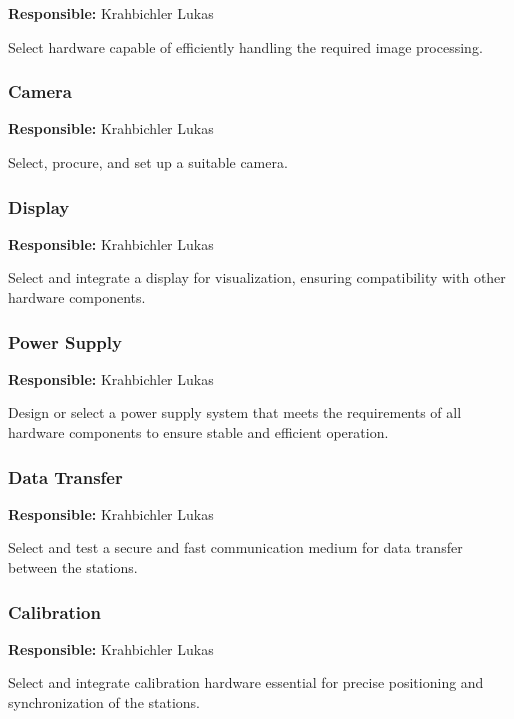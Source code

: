 \textbf{Responsible:} Krahbichler Lukas

Select hardware capable of efficiently handling the required image processing.

\subsubsection{Camera} %

\textbf{Responsible:} Krahbichler Lukas

Select, procure, and set up a suitable camera.

\subsubsection{Display} %

\textbf{Responsible:} Krahbichler Lukas

Select and integrate a display for visualization, ensuring compatibility with other hardware components.

\subsubsection{Power Supply}

\textbf{Responsible:} Krahbichler Lukas

Design or select a power supply system that meets the requirements of all hardware components to ensure stable and efficient operation.

\subsubsection{Data Transfer}

\textbf{Responsible:} Krahbichler Lukas

Select and test a secure and fast communication medium for data transfer between the stations.

\subsubsection{Calibration}

\textbf{Responsible:} Krahbichler Lukas

Select and integrate calibration hardware essential for precise positioning and synchronization of the stations.

